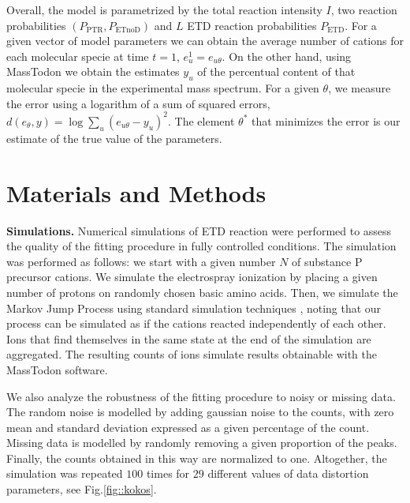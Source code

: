 \documentclass{llncs}
\begin{document}
        Overall, the model is parametrized by the total reaction intensity $I$, two reaction probabilities $(P_\text{PTR}, P_\text{ETnoD})$ and $L$ ETD reaction probabilities $P_\text{ETD}$. For a given vector of model parameters  we can obtain the average number of cations for each molecular specie at time $t=1$, $e_u^1 =e_{u\theta}$. On the other hand, using MassTodon we obtain the estimates $y_u$ of the percentual content of that molecular specie in the experimental mass spectrum. For a given $\theta$, we measure the error using a logarithm of a sum of squared errors, $d(e_\theta,y) = \log \sum_u (e_{u\theta}-y_u)^2$. The element $\theta^*$ that minimizes the error is our estimate of the true value of the parameters.


\section{Materials and Methods}

        \textbf{Simulations.} Numerical simulations of ETD reaction were performed to assess the quality of the fitting procedure in fully controlled conditions. The simulation was performed as follows: we start with a given number $N$ of substance P precursor cations. We simulate the electrospray ionization by placing a given number of protons on randomly chosen basic amino acids. Then, we simulate the Markov Jump Process using standard simulation techniques \cite{Gillespie1977-fr}, noting that our process can be simulated as if the cations reacted independently of each other. Ions that find themselves in the same state at the end of the simulation are aggregated. The resulting counts of ions simulate results obtainable with the MassTodon software.

        We also analyze the robustness of the fitting procedure to noisy or missing data. The random noise is modelled by adding gaussian noise to the counts, with zero mean and standard deviation expressed as a given percentage of the count. Missing data is modelled by randomly removing a given proportion of the peaks. Finally, the counts obtained in this way are normalized to one. Altogether, the simulation was repeated $100$ times for $29$ different values of data distortion parameters, see Fig.\ref{fig::kokos}.
\end{document}
